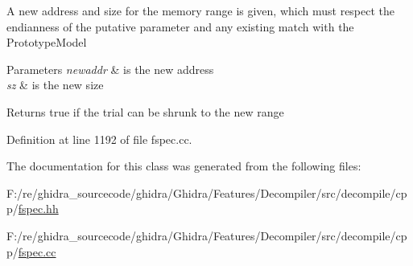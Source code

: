 A new address and size for the memory range is given, which must respect the endianness of the putative parameter and any existing match with the Prototype\+Model 
\begin{DoxyParams}{Parameters}
{\em newaddr} & is the new address \\
\hline
{\em sz} & is the new size \\
\hline
\end{DoxyParams}
\begin{DoxyReturn}{Returns}
true if the trial can be shrunk to the new range 
\end{DoxyReturn}


Definition at line 1192 of file fspec.\+cc.



The documentation for this class was generated from the following files\+:\begin{DoxyCompactItemize}
\item 
F\+:/re/ghidra\+\_\+sourcecode/ghidra/\+Ghidra/\+Features/\+Decompiler/src/decompile/cpp/\mbox{\hyperlink{fspec_8hh}{fspec.\+hh}}\item 
F\+:/re/ghidra\+\_\+sourcecode/ghidra/\+Ghidra/\+Features/\+Decompiler/src/decompile/cpp/\mbox{\hyperlink{fspec_8cc}{fspec.\+cc}}\end{DoxyCompactItemize}
